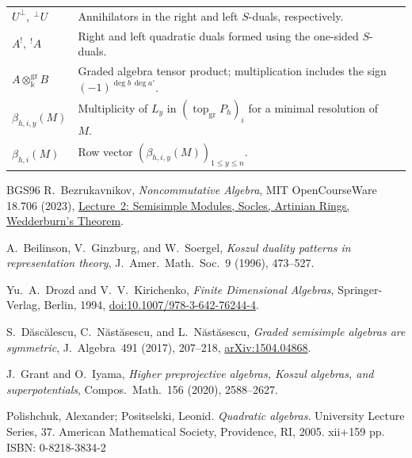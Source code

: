 \documentclass[11pt,a4paper]{article}
\numberwithin{equation}{section}
\theoremstyle{all}
\theoremstyle{remark}
\newcommand{\grtop}{\operatorname{top}\nolimits_{\mathrm{gr}}}
\begin{document}
\begin{longtable}{@{}p{}p{}r@{}}
$U^\perp,\ {}^\perp U$ & Annihilators in the right and left $S$-duals, respectively. & \hyperref[def:orthogonals]{\pageref*{def:orthogonals}}\\[3pt]
$A^!,\ {}^!A$ & Right and left quadratic duals formed using the one-sided $S$-duals. & \hyperref[def:S-quadratic-duals]{\pageref*{def:S-quadratic-duals}}\\[3pt]
$A\otimes_\Bbbk^{\mathrm{gr}}B$ & Graded algebra tensor product; multiplication includes the sign $(-1)^{\deg b\,\deg a'}$. & \hyperref[def:algebra-tensor-products]{\pageref*{def:algebra-tensor-products}}\\[3pt]
$\beta_{h,i,y}(M)$ & Multiplicity of $L_y$ in $(\grtop P_h)_i$ for a minimal resolution of $M$. & \hyperref[not:graded-betti]{\pageref*{not:graded-betti}}\\[3pt]
$\beta_{h,i}(M)$ & Row vector $(\beta_{h,i,y}(M))_{1\leq y\leq n}$. & \hyperref[not:graded-betti]{\pageref*{not:graded-betti}}\\[3pt]
\end{longtable}
\endgroup

\clearpage
\begin{thebibliography}{BGS96}
R.~Bezrukavnikov,
\emph{Noncommutative Algebra}, MIT OpenCourseWare 18.706 (2023),
\href{https://ocw.mit.edu/courses/18-706-noncommutative-algebra-spring-2023/resources/mit18_706_s23_lec02_pdf/}{Lecture~2: Semisimple Modules, Socles, Artinian Rings, Wedderburn's Theorem}.

A.~Beilinson, V.~Ginzburg, and W.~Soergel,
\emph{Koszul duality patterns in representation theory},
J.~Amer.~Math.~Soc.~9 (1996), 473--527.

Yu.~A.~Drozd and V.~V.~Kirichenko,
\emph{Finite Dimensional Algebras},
Springer-Verlag, Berlin, 1994,
\href{https://doi.org/10.1007/978-3-642-76244-4}{doi:10.1007/978-3-642-76244-4}.

S.~D\u{a}sc\u{a}lescu, C.~N\u{a}st\u{a}sescu, and L.~N\u{a}st\u{a}sescu,
\emph{Graded semisimple algebras are symmetric},
J.~Algebra~491 (2017), 207--218,
\href{https://arxiv.org/abs/1504.04868}{arXiv:1504.04868}.

J.~Grant and O.~Iyama,
\emph{Higher preprojective algebras, Koszul algebras, and superpotentials},
Compos.~Math.~156 (2020), 2588--2627.

Polishchuk, Alexander; Positselski, Leonid. \emph{Quadratic algebras}. University Lecture Series, 37. American Mathematical Society, Providence, RI, 2005. xii+159 pp. ISBN: 0-8218-3834-2
\end{thebibliography}
\end{document}

